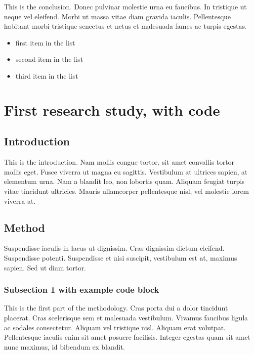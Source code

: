 \documentclass[12pt,a4paper,]{report}
\providecommand{\tightlist}{%
  \setlength{\itemsep}{0pt}\setlength{\parskip}{0pt}}
\begin{document}
This is the conclusion. Donec pulvinar molestie urna eu faucibus. In
tristique ut neque vel eleifend. Morbi ut massa vitae diam gravida
iaculis. Pellentesque habitant morbi tristique senectus et netus et
malesuada fames ac turpis egestas.

\begin{itemize}
\tightlist
\item
  first item in the list
\item
  second item in the list
\item
  third item in the list
\end{itemize}

\hypertarget{first-research-study-with-code}{%
\chapter{First research study, with
code}\label{first-research-study-with-code}}

\hypertarget{introduction-1}{%
\section{Introduction}\label{introduction-1}}

This is the introduction. Nam mollis congue tortor, sit amet convallis
tortor mollis eget. Fusce viverra ut magna eu sagittis. Vestibulum at
ultrices sapien, at elementum urna. Nam a blandit leo, non lobortis
quam. Aliquam feugiat turpis vitae tincidunt ultricies. Mauris
ullamcorper pellentesque nisl, vel molestie lorem viverra at.

\hypertarget{method}{%
\section{Method}\label{method}}

Suspendisse iaculis in lacus ut dignissim. Cras dignissim dictum
eleifend. Suspendisse potenti. Suspendisse et nisi suscipit, vestibulum
est at, maximus sapien. Sed ut diam tortor.

\hypertarget{subsection-1-with-example-code-block}{%
\subsection{Subsection 1 with example code
block}\label{subsection-1-with-example-code-block}}

This is the first part of the methodology. Cras porta dui a dolor
tincidunt placerat. Cras scelerisque sem et malesuada vestibulum.
Vivamus faucibus ligula ac sodales consectetur. Aliquam vel tristique
nisl. Aliquam erat volutpat. Pellentesque iaculis enim sit amet posuere
facilisis. Integer egestas quam sit amet nunc maximus, id bibendum ex
blandit.
\end{document}
